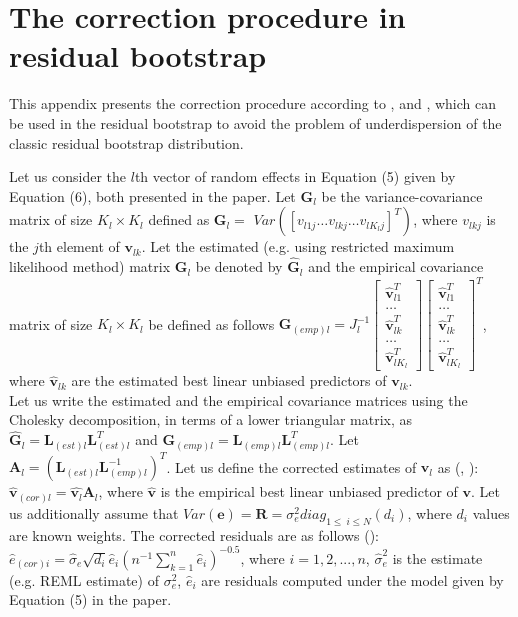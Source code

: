 \section*{The correction procedure in residual bootstrap}
This appendix presents the correction procedure according to \cite{carpenter2003novel}, \cite{chambers2013random} and \cite{thai2013comparison}, which can be used in the residual bootstrap to avoid the problem of  underdispersion of the classic residual bootstrap distribution.

Let us consider the $l$th vector of random effects in Equation (5) given by Equation (6), both presented in the paper. Let $\boldsymbol{G}_l$ be the variance-covariance matrix of size $K_l \times K_l$ defined as $\boldsymbol{G}_l=$ $Var\left(\left[ v_{l1j} \dots v_{lkj} \dots v_{lK_lj} \right]^T  \right)$, where $v_{lkj}$ is the $j$th element of $\mathbf{v}_{lk}$. Let the estimated (e.g. using restricted maximum likelihood method) matrix  $\boldsymbol{G}_l$  be denoted by $\hat{\boldsymbol{G}}_{l}$ and the empirical covariance matrix of size $K_l \times K_l$  be defined as follows ${\boldsymbol{G}}_{(emp)l}=J_l^{-1}
\left[ \begin{array}{c}
	\hat{\mathbf{v}}_{l1}^T \\
	\dots \\
	\hat{\mathbf{v}}_{lk}^T \\
	\dots \\
	\hat{\mathbf{v}}_{lK_l}^T
\end{array}
\right]
\left[ \begin{array}{c}
	\hat{\mathbf{v}}_{l1}^T \\
	\dots \\
	\hat{\mathbf{v}}_{lk}^T \\
	\dots \\
	\hat{\mathbf{v}}_{lK_l}^T
\end{array}
\right]^T
$, where $\hat{\mathbf{v}}_{lk}$ are the estimated best linear unbiased predictors of ${\mathbf{v}}_{lk}$.\\

Let us write the estimated and the empirical covariance matrices using the Cholesky decomposition, in terms of a lower triangular matrix, as $\hat{\boldsymbol{G}}_l = \mathbf{L}_{(est)l} \mathbf{L}^T_{(est)l} $ and $\boldsymbol{G}_{(emp)l} = \mathbf{L}_{(emp)l} \mathbf{L}_{(emp)l}^T$. Let $\mathbf{A}_l=(\mathbf{L}_{(est)l} \mathbf{L}_{(emp)l}^{-1})^T$. Let us define the corrected estimates of $\mathbf{v}_l$ as (\cite{carpenter2003novel}, \cite{thai2013comparison}): $\hat{\mathbf{v}}_{(cor)l} =\hat{\mathbf{v}_l} \mathbf{A}_l$, where $\hat{\mathbf{v}}$ is the empirical best linear unbiased predictor of $\mathbf{v}$. Let us additionally assume that $Var(\mathbf{e})=\mathbf{R}=\sigma^2_e diag_{1 \leq \ i \leq N} (d_i)$, where $d_i$ values are known weights. The corrected residuals are as follows (\cite{chambers2013random}): $\hat{{e}}_{(cor)i}=\hat{\sigma}_e \sqrt{d_i} \hat{e}_i (n^{-1}\sum_{k=1}^{n} \hat{e}_i )^{-0.5}$, where $i=1,2,...,n$, $\hat{\sigma}^2_e$ is the estimate (e.g. REML estimate) of ${\sigma}^2_e$, $\hat{e}_i$ are residuals computed under the model given by Equation (5) in the paper.

